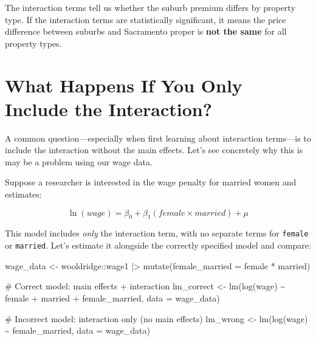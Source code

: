 \documentclass[
  letterpaper,
  DIV=11,
  numbers=noendperiod]{scrreprt}
\newenvironment{Shaded}{\begin{snugshade}}{\end{snugshade}}
\newcommand{\AttributeTok}[1]{\textcolor[rgb]{0.40,0.45,0.13}{#1}}
\newcommand{\CommentTok}[1]{\textcolor[rgb]{0.37,0.37,0.37}{#1}}
\newcommand{\FunctionTok}[1]{\textcolor[rgb]{0.28,0.35,0.67}{#1}}
\newcommand{\NormalTok}[1]{\textcolor[rgb]{0.00,0.23,0.31}{#1}}
\newcommand{\OtherTok}[1]{\textcolor[rgb]{0.00,0.23,0.31}{#1}}
\newcommand{\SpecialCharTok}[1]{\textcolor[rgb]{0.37,0.37,0.37}{#1}}
\begin{document}
The interaction terms tell us whether the suburb premium differs by
property type. If the interaction terms are statistically significant,
it means the price difference between suburbs and Sacramento proper is
\textbf{not the same} for all property types.

\section{What Happens If You Only Include the
Interaction?}\label{what-happens-if-you-only-include-the-interaction}

A common question---especially when first learning about interaction
terms---is to include the interaction without the main effects. Let's
see concretely why this is may be a problem using our wage data.

Suppose a researcher is interested in the wage penalty for married women
and estimates:

\[
\ln(wage) = \beta_0 + \beta_1(female \times married) + \mu
\]

This model includes \emph{only} the interaction term, with no separate
terms for \texttt{female} or \texttt{married}. Let's estimate it
alongside the correctly specified model and compare:

\begin{Shaded}
\begin{Highlighting}[]
\NormalTok{wage\_data }\OtherTok{\textless{}{-}}\NormalTok{ wooldridge}\SpecialCharTok{::}\NormalTok{wage1 }\SpecialCharTok{|\textgreater{}}
    \FunctionTok{mutate}\NormalTok{(}\AttributeTok{female\_married =}\NormalTok{ female }\SpecialCharTok{*}\NormalTok{ married)}

\CommentTok{\# Correct model: main effects + interaction}
\NormalTok{lm\_correct }\OtherTok{\textless{}{-}} \FunctionTok{lm}\NormalTok{(}\FunctionTok{log}\NormalTok{(wage) }\SpecialCharTok{\textasciitilde{}}\NormalTok{ female }\SpecialCharTok{+}\NormalTok{ married }\SpecialCharTok{+}\NormalTok{ female\_married, }\AttributeTok{data =}\NormalTok{ wage\_data)}

\CommentTok{\# Incorrect model: interaction only (no main effects)}
\NormalTok{lm\_wrong }\OtherTok{\textless{}{-}} \FunctionTok{lm}\NormalTok{(}\FunctionTok{log}\NormalTok{(wage) }\SpecialCharTok{\textasciitilde{}}\NormalTok{ female\_married, }\AttributeTok{data =}\NormalTok{ wage\_data)}
\end{Highlighting}
\end{Shaded}
\end{document}
